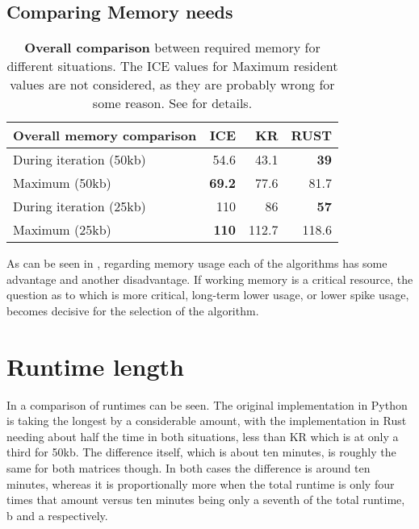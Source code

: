 \subsection{Comparing Memory needs}\label{sec:compmemory}

\begin{table}[!htbp]
    \begin{tabular}{lrrr}
        \textbf{Overall memory comparison} & ICE & KR & RUST \\
        \midrule
        During iteration (50kb) &   54.6 & 43.1 & \textbf{39}   \\
        Maximum          (50kb) &   \textbf{69.2} & 77.6 & 81.7 \\
        During iteration (25kb) &   110 & 86 & \textbf{57}  \\
        Maximum          (25kb) &   \textbf{110} & 112.7 & 118.6 \\
    \end{tabular}
    \caption[Memory needs comparison]
    {\textbf{Overall comparison} between required memory for different
    situations. The ICE values for Maximum resident values are not considered,
    as they are probably wrong for some reason. See  for
    details.}
    \label{tab:compmem}
\end{table}

As can be seen in , regarding memory usage each of the
algorithms has some advantage and another disadvantage. If working memory is a
critical resource, the question as to which is more critical, long-term lower
usage, or lower spike usage, becomes decisive for the selection of the
algorithm.




\section{Runtime length}\label{sec:runtime}



In  a comparison of runtimes can be seen. The original
implementation in Python is taking the longest by a considerable amount, with
the implementation in Rust needing about half the time in both situations, less
than KR which is at only a third for 50kb. The difference itself, which is
about ten minutes, is roughly the same for both matrices though. In both cases
the difference is around ten minutes, whereas it is proportionally more when
the total runtime is only four times that amount versus ten minutes being only
a seventh of the total runtime, b and a
respectively.

